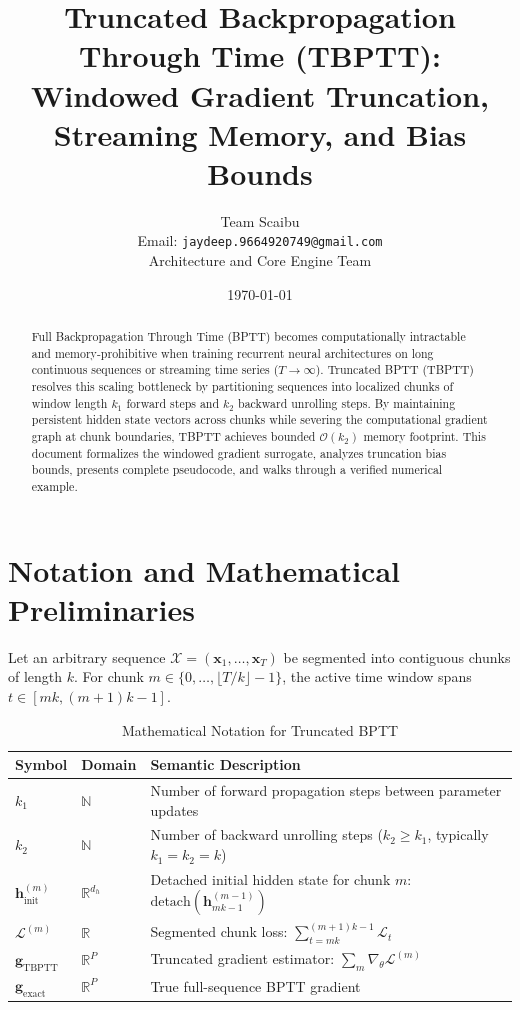 \documentclass[11pt,a4paper]{article}
\title{Truncated Backpropagation Through Time (TBPTT): Windowed Gradient Truncation, Streaming Memory, and Bias Bounds}
\author{Team Scaibu \\ \small Email: \texttt{jaydeep.9664920749@gmail.com} \\ \small Architecture and Core Engine Team}
\date{\today}
\theoremstyle{definition}
\begin{document}
\maketitle

\begin{abstract}
Full Backpropagation Through Time (BPTT) becomes computationally intractable and memory-prohibitive when training recurrent neural architectures on long continuous sequences or streaming time series ($T \to \infty$). Truncated BPTT (TBPTT) resolves this scaling bottleneck by partitioning sequences into localized chunks of window length $k_1$ forward steps and $k_2$ backward unrolling steps. By maintaining persistent hidden state vectors across chunks while severing the computational gradient graph at chunk boundaries, TBPTT achieves bounded $\mathcal{O}(k_2)$ memory footprint. This document formalizes the windowed gradient surrogate, analyzes truncation bias bounds, presents complete pseudocode, and walks through a verified numerical example.
\end{abstract}

\section{Notation and Mathematical Preliminaries}

Let an arbitrary sequence $\mathcal{X} = (\mathbf{x}_1, \dots, \mathbf{x}_T)$ be segmented into contiguous chunks of length $k$. For chunk $m \in \{0, \dots, \lfloor T/k \rfloor - 1\}$, the active time window spans $t \in [mk, (m+1)k - 1]$.

\begin{table}[h]
\centering
\caption{Mathematical Notation for Truncated BPTT}
\begin{tabular}{lll}
\toprule
\textbf{Symbol} & \textbf{Domain} & \textbf{Semantic Description} \\
\midrule
$k_1$ & $\mathbb{N}$ & Number of forward propagation steps between parameter updates \\
$k_2$ & $\mathbb{N}$ & Number of backward unrolling steps ($k_2 \ge k_1$, typically $k_1 = k_2 = k$) \\
$\mathbf{h}_{\text{init}}^{(m)}$ & $\mathbb{R}^{d_h}$ & Detached initial hidden state for chunk $m$: $\text{detach}(\mathbf{h}_{mk-1}^{(m-1)})$ \\
$\mathcal{L}^{(m)}$ & $\mathbb{R}$ & Segmented chunk loss: $\sum_{t=mk}^{(m+1)k - 1} \mathcal{L}_t$ \\
$\mathbf{g}_{\text{TBPTT}}$ & $\mathbb{R}^P$ & Truncated gradient estimator: $\sum_m \nabla_\theta \mathcal{L}^{(m)}$ \\
$\mathbf{g}_{\text{exact}}$ & $\mathbb{R}^P$ & True full-sequence BPTT gradient \\
\bottomrule
\end{tabular}
\end{table}
\end{document}
